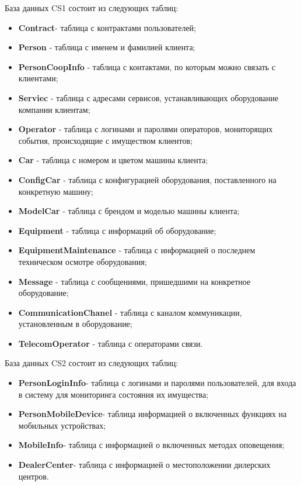 \newpage
\vspace{0.5cm}
База данных CS1 состоит из следующих таблиц:
\begin{itemize}
	\item \textbf{Contract}- таблица с контрактами пользователей;
	\item \textbf{Person} - таблица с именем и фамилией клиента;
	\item \textbf{PersonCoopInfo} - таблица с контактами, по которым можно связать с клиентами;
	\item \textbf{Serviec} - таблица с адресами сервисов, устанавливающих оборудование компании клиентам;
	\item \textbf{Operator} - таблица с логинами и паролями операторов, мониторящих события, происходящие с имуществом клиентов;
	\item \textbf{Car} - таблица с номером и цветом машины клиента;
	\item \textbf{ConfigCar} - таблица с конфигурацией оборудования, поставленного на конкретную машину;
	\item \textbf{ModelCar} - таблица с брендом и моделью машины клиента;
	\item \textbf{Equipment} -  таблица с информаций об оборудование;
	\item \textbf{EquipmentMaintenance} - таблица с информацией о последнем техническом осмотре оборудования;
	\item \textbf{Message} - таблица с сообщениями, пришедшими на конкретное оборудование;
	\item \textbf{CommunicationChanel} - таблица с каналом коммуникации, установленным в оборудование;
	\item \textbf{TelecomOperator} - таблица с операторами связи.
	
\end{itemize}

\vspace{0.5cm}
База данных CS2 состоит из следующих таблиц:
\begin{itemize}
	\item \textbf{PersonLoginInfo}- таблица с логинами и паролями пользователей, для входа в систему для мониторинга состояния их имущества;
	\item \textbf{PersonMobileDevice}- таблица информацией о включенных функциях на мобильных устройствах;
	\item \textbf{MobileInfo}- таблица с информацией о включенных методах оповещения;
	\item \textbf{DealerCenter}- таблица с информацией о местоположении дилерских центров.
\end{itemize}


